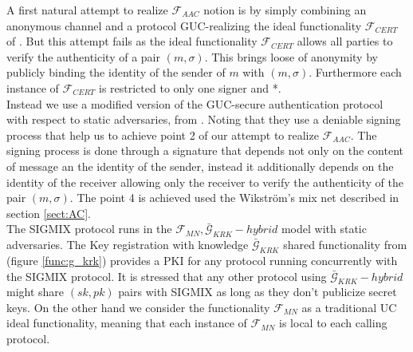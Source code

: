 \documentclass{acm_proc_article-sp}
\begin{document}
A first natural attempt to realize $\mathcal{F}_{AAC}$ notion is by simply combining an anonymous
channel and a protocol GUC-realizing the ideal functionality $\mathcal{F}_{CERT}$ of \cite{conf/csfw/Canetti04}.
But this attempt fails as the ideal functionality $\mathcal{F}_{CERT}$ allows all parties to verify the authenticity
of a pair $(m, \sigma)$. This brings loose of anonymity by publicly binding the identity of the sender of $m$ with
$(m, \sigma)$. Furthermore each instance of $\mathcal{F}_{CERT}$ is restricted to only one signer and *.
\\
Instead we use a modified version of the GUC-secure authentication protocol with respect to static adversaries, from
\cite{conf/tcc/DodisKSW09}. Noting that they use a deniable signing process that help us to achieve point 2 of our
attempt to realize $\mathcal{F}_{AAC}$. The signing process is done through a signature that depends
not only on the content of message an the identity of the sender, instead it additionally depends on the identity
of the receiver allowing only the receiver to verify the authenticity of the pair $(m, \sigma)$. The point 4 is
achieved used the Wikstr\"om's mix net described in section \ref{sect:AC}.\\
The SIGMIX protocol runs in the $\mathcal{F}_{MN}, \bar{\mathcal{G}}_{KRK}-hybrid$ model with static adversaries.
The Key registration with knowledge $\bar{\mathcal{G}}_{KRK}$ shared functionality from \cite{conf/tcc/DodisKSW09}
(figure \ref{func:g_krk}) provides a PKI for any protocol running concurrently with the SIGMIX protocol. It is
stressed that any other protocol using $\bar{\mathcal{G}}_{KRK}-hybrid$ might share $(sk,pk)$ pairs with SIGMIX
as long as they don't publicize secret keys.
On the other hand we consider the functionality $\mathcal{F}_{MN}$ as a traditional UC ideal functionality,
meaning that each instance of $\mathcal{F}_{MN}$ is local to each calling protocol.
\end{document}
